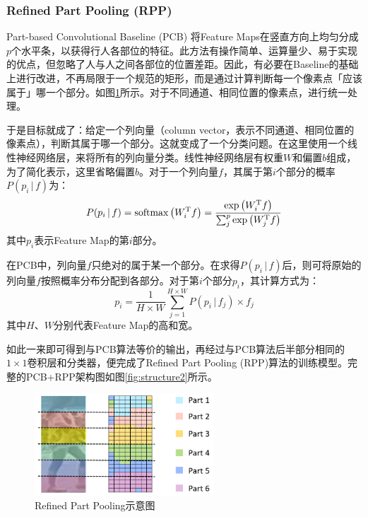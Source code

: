 \subsubsection{Refined Part Pooling (RPP)}
Part-based Convolutional Baseline (PCB) 将Feature Maps在竖直方向上均匀分成$p$个水平条，以获得行人各部位的特征。此方法有操作简单、运算量少、易于实现的优点，但忽略了人与人之间各部位的位置差距。因此，有必要在Baseline的基础上进行改进，不再局限于一个规范的矩形，而是通过计算判断每一个像素点「应该属于」哪一个部分。如图\ref{fig:refined}所示。对于不同通道、相同位置的像素点，进行统一处理。

于是目标就成了：给定一个列向量（column vector，表示不同通道、相同位置的像素点），判断其属于哪一个部分。这就变成了一个分类问题。在这里使用一个线性神经网络层，来将所有的列向量分类。线性神经网络层有权重$W$和偏置$b$组成，为了简化表示，这里省略偏置$b$。对于一个列向量$f$，其属于第$i$个部分的概率$P(p_i\,\vert\,f)$为：
\begin{equation}
P(p_i\,\vert\,f)=\mathop{\rm softmax}\left(W_i^{\rm T}f\right)=\frac{\exp\left(W_i^{\rm T}f\right)}{\sum_j^p\exp\left(W_j^{\rm T}f\right)}
\end{equation}
其中$p_i$表示Feature Map的第$i$部分。

在PCB中，列向量$f$只绝对的属于某一个部分。在求得$P(p_i\,\vert\,f)$后，则可将原始的列向量$f$按照概率分布分配到各部分。对于第$i$个部分$p_i$，其计算方式为：
\begin{equation}
p_i=\frac{1}{H\times W}\sum_{j=1}^{H\times W}P(p_i\,\vert\,f_j)\times f_j
\end{equation}
其中$H$、$W$分别代表Feature Map的高和宽。

如此一来即可得到与PCB算法等价的输出，再经过与PCB算法后半部分相同的$1\times1$卷积层和分类器，便完成了Refined Part Pooling (RPP)算法的训练模型。完整的PCB+RPP架构图如图\ref{fig:structure2}所示。

\begin{figure}
\centering
\includegraphics[width=0.6\textwidth]{figure/outliers1}
\caption{Refined Part Pooling示意图}
\label{fig:refined}
\end{figure}

